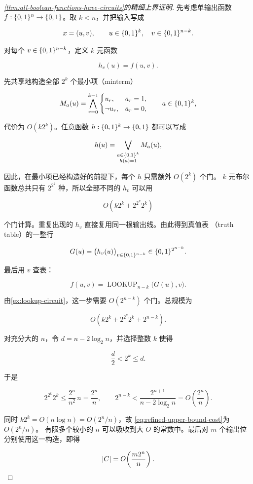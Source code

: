 \begin{proof}[\cref{thm:all-boolean-functions-have-circuits}的精细上界证明]
  先考虑单输出函数 $f:\{0,1\}^n\to\{0,1\}$。取 $k<n$，并把输入写成

  \[
    x=(u,v),
    \qquad
    u\in\{0,1\}^k,
    \quad
    v\in\{0,1\}^{n-k}.
  \]

  对每个 $v\in\{0,1\}^{n-k}$，定义 $k$ 元函数

  \[
    h_v(u)=f(u,v).
  \]

  先共享地构造全部 $2^k$ 个最小项（minterm）

  \[
    M_a(u)=\bigwedge_{r=0}^{k-1}
    \begin{cases}
      u_r, & a_r=1,\\
      \neg u_r, & a_r=0,
    \end{cases}
    \qquad a\in\{0,1\}^k,
  \]

  代价为 $O(k2^k)$。任意函数 $h:\{0,1\}^k\to\{0,1\}$ 都可以写成

  \[
    h(u)=\bigvee_{\substack{a\in\{0,1\}^k\\h(a)=1}}M_a(u),
  \]

  因此，在最小项已经构造好的前提下，每个 $h$ 只需额外 $O(2^k)$ 个门。
  $k$ 元布尔函数总共只有 $2^{2^k}$ 种，所以全部不同的 $h_v$ 可以用

  \[
    O\!\left(k2^k+2^{2^k}2^k\right)
  \]

  个门计算。重复出现的 $h_v$ 直接复用同一根输出线。由此得到真值表
  （truth table）的一整行

  \[
    G(u)=\bigl(h_v(u)\bigr)_{v\in\{0,1\}^{n-k}}
    \in\{0,1\}^{2^{n-k}}.
  \]

  最后用 $v$ 查表：

  \[
    f(u,v)=\operatorname{LOOKUP}_{n-k}\bigl(G(u),v\bigr).
  \]

  由\cref{ex:lookup-circuit}，这一步需要 $O(2^{n-k})$ 个门。总规模为

  \begin{equation}
    \label{eq:refined-upper-bound-cost}
    O\!\left(k2^k+2^{2^k}2^k+2^{n-k}\right).
  \end{equation}

  对充分大的 $n$，令 $d=n-2\log_2 n$，并选择整数 $k$ 使得

  \[
    \frac d2<2^k\leq d.
  \]

  于是

  \[
    2^{2^k}2^k
      \leq \frac{2^n}{n^2}\,n
      =\frac{2^n}{n},
    \qquad
    2^{n-k}
      <\frac{2^{n+1}}{n-2\log_2 n}
      =O\!\left(\frac{2^n}{n}\right).
  \]

  同时 $k2^k=O(n\log n)=O(2^n/n)$，故
  \cref{eq:refined-upper-bound-cost}为 $O(2^n/n)$。
  有限多个较小的 $n$ 可以吸收到大 $O$ 的常数中。最后对 $m$ 个输出位
  分别使用这一构造，即得

  \[
    \lvert C\rvert=O\!\left(\frac{m2^n}{n}\right).
  \]
\end{proof}

